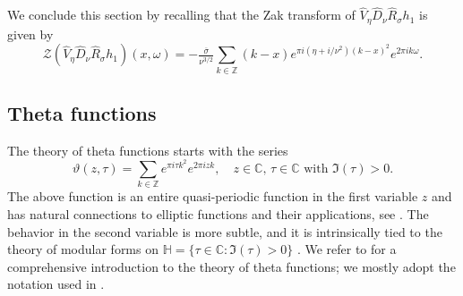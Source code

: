 \documentclass[reqno,a4paper,12pt]{amsart}
\numberwithin{equation}{section}
\newcommand{\Z}{\mathbb Z}
\newcommand{\C}{\mathbb C}
\newcommand{\HH}{\mathbb H}
\newcommand{\zak}{\mathcal{Z}}
\begin{document}
We conclude this section by recalling that the Zak transform of $\widehat{V}_\eta \widehat{D}_\nu\widehat{R}_{\sigma} h_1$ is given by
\begin{equation}\label{eq:Zak_general_h1}
\zak (\widehat{V}_\eta \widehat{D}_\nu\widehat{R}_{\sigma} h_1) (x,\omega) = -\tfrac{\overline{\sigma}}{\nu^{3/2}}
        \sum_{k\in\Z}  (k-x) e^{\pi i (\eta+i/\nu^2)(k-x)^2} e^{2\pi i k\omega}.
\end{equation}

\subsection{Theta functions}\label{sec:theta}

The theory of theta functions starts with the series
\begin{equation}\label{eq:def:theta}
    \vartheta(z,\tau) = \sum\limits_{k\in\Z}e^{\pi i \tau k^2}e^{2\pi i z k},\quad z\in \C,\, \tau\in \C \text{ with } \Im(\tau)>0.
\end{equation}
The above function is an entire quasi-periodic function in the first variable $z$ and has natural connections to elliptic functions and their applications, see \cite{MumfordTataI,FarkasKra2001}. The behavior in the second variable is more subtle, and it is intrinsically tied to the theory of modular forms on $\HH = \{\tau \in \C: \Im(\tau)>0\}$ \cite{MumfordTataI}.
We refer to \cite{MumfordTataI, Krazer1903,FarkasKra2001} for a comprehensive introduction to the theory of theta functions; we mostly adopt the notation used in \cite{MumfordTataI}.
\end{document}
